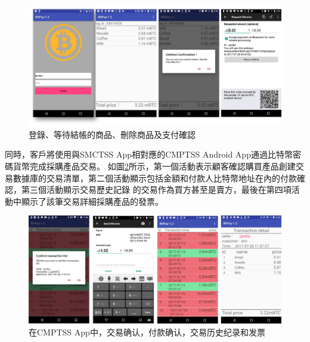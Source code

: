 \begin{figure}[h]
	\centering
	\includegraphics[width = 1\textwidth]{fig7.png}
	\caption{登錄、等待結帳的商品、刪除商品及支付確認}\label{fig7}
\end{figure}

同時，客戶將使用與SMCTSS App相對應的CMPTSS Android App通過比特幣密碼貨幣完成採購產品交易。 如圖\ref{fig8}所示，第一個活動表示顧客確認購買產品創建交易數據庫的交易清單，第二個活動顯示包括金額和付款人比特幣地址在內的付款確認，第三個活動顯示交易歷史記錄 的交易作為買方甚至是賣方，最後在第四項活動中顯示了該筆交易詳細採購產品的發票。    

\begin{figure}[h]
	\centering
	\includegraphics[width = 1\textwidth]{fig8.png}
	\caption{在CMPTSS App中，交易确认，付款确认，交易历史纪录和发票}\label{fig8}
\end{figure}